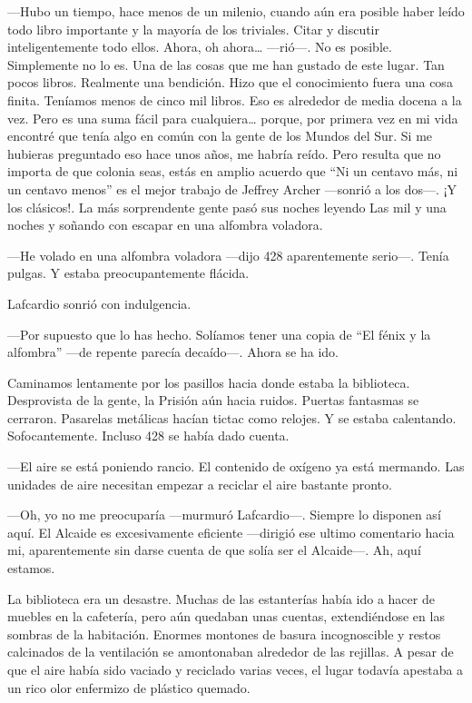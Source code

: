 ---Hubo un tiempo, hace menos de un milenio, cuando aún era posible
haber leído todo libro importante y la mayoría de los triviales. Citar y
discutir inteligentemente todo ellos. Ahora, oh ahora\ldots{} ---rió---.
No es posible. Simplemente no lo es. Una de las cosas que me han gustado
de este lugar. Tan pocos libros. Realmente una bendición. Hizo que el
conocimiento fuera una cosa finita. Teníamos menos de cinco mil libros.
Eso es alrededor de media docena a la vez. Pero es una suma fácil para
cualquiera\ldots{} porque, por primera vez en mi vida encontré que tenía
algo en común con la gente de los Mundos del Sur. Si me hubieras
preguntado eso hace unos años, me habría reído. Pero resulta que no
importa de que colonia seas, estás en amplio acuerdo que ``Ni un centavo
más, ni un centavo menos'' es el mejor trabajo de Jeffrey Archer
---sonrió a los dos---. ¡Y los clásicos!. La más sorprendente gente pasó
sus noches leyendo Las mil y una noches y soñando con escapar en una
alfombra voladora.

---He volado en una alfombra voladora ---dijo 428 aparentemente
serio---. Tenía pulgas. Y estaba preocupantemente flácida.

Lafcardio sonrió con indulgencia.

---Por supuesto que lo has hecho. Solíamos tener una copia de ``El fénix
y la alfombra'' ---de repente parecía decaído---. Ahora se ha ido.

Caminamos lentamente por los pasillos hacia donde estaba la biblioteca.
Desprovista de la gente, la Prisión aún hacia ruidos. Puertas fantasmas
se cerraron. Pasarelas metálicas hacían tictac como relojes. Y se estaba
calentando. Sofocantemente. Incluso 428 se había dado cuenta.

---El aire se está poniendo rancio. El contenido de oxígeno ya está
mermando. Las unidades de aire necesitan empezar a reciclar el aire
bastante pronto.

---Oh, yo no me preocuparía ---murmuró Lafcardio---. Siempre lo disponen
así aquí. El Alcaide es excesivamente eficiente ---dirigió ese ultimo
comentario hacia mi, aparentemente sin darse cuenta de que solía ser el
Alcaide---. Ah, aquí estamos.

La biblioteca era un desastre. Muchas de las estanterías había ido a
hacer de muebles en la cafetería, pero aún quedaban unas cuentas,
extendiéndose en las sombras de la habitación. Enormes montones de
basura incognoscible y restos calcinados de la ventilación se
amontonaban alrededor de las rejillas. A pesar de que el aire había sido
vaciado y reciclado varias veces, el lugar todavía apestaba a un rico
olor enfermizo de plástico quemado.


